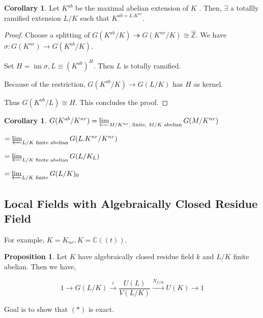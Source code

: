\documentclass{article}
\theoremstyle{definition}
\numberwithin{theorem}{subsection}
\newtheorem{proposition}[theorem]{Proposition}
\newtheorem{corollary}[theorem]{Corollary}
\begin{document}
    \begin{corollary}
        Let \(K^{ab}\) be the maximal abelian extension of \(K\) . Then, \(\exists\) a totallly ramified extension \(L / K\) such that \(K^{ab = L . K^{nr}}\).
    \end{corollary}

    \begin{proof}
        Choose a splitting of \(G(K^{ab} / K) \twoheadrightarrow G(K^{nr} / K) \cong \widehat{\mathbb{Z}}\). We have \(\sigma : G(K^{nr}) \to G(K^{ab} / K)\).
        
        Set \(H = \operatorname{im} \sigma, L \equiv  (K^{ab})^H\). Then \(L\) is totally ramified.
        
        Because of the restriction, \(G(K^{ab} / K) \to G(L / K)\) has \(H\) as kernel.
        
        Thus \(G(K^{ab} / L) \cong H\). This concludes the proof.
    \end{proof}

    \begin{corollary}
        \(G(K^{ab} / K^{nr}) = \varprojlim_{M / K^{nr}, \text{ finite, } M / K \text{ abelian} } G(M / K^{nr})\)
        
        \(=\varprojlim_{L / K \text{ finite abelian} } G(L.K^{nr} / K^{nr})\)

        \(= \varprojlim_{L / K \text{ finite abelian}} G(L / K_L)\) 

        \(= \varprojlim_{L / K \text{ finite}} G(L / K)_0\)
    \end{corollary}

    \subsection*{Local Fields with Algebraically Closed Residue Field}

    For example, \(K = K_{nr}, K = \mathbb{C} ((t))\).

    \begin{proposition}
        
        Let \(K\) have algebraically closed residue field \(k\) and \(L / K\) finite abelian. Then we have,

        \[
            1 \to G(L / K) \xrightarrow{i} \frac{U(L)}{V(L / K)} \xrightarrow{N_{L / K}} U(K) \to 1\tag*{\((\ast)\)}
        \]
    \end{proposition}

    Goal is to show that \((\ast)\) is exact.
\end{document}
